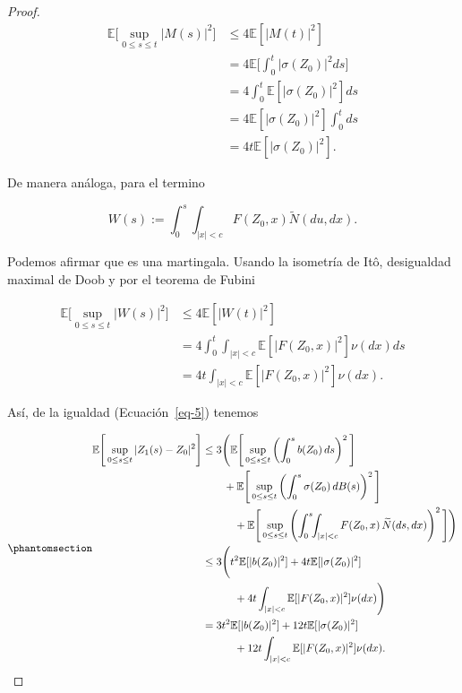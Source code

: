 \documentclass[
  spanish,
  us-letterpaper,
]{scrreprt}
\theoremstyle{plain}
\theoremstyle{plain}
\theoremstyle{plain}
\theoremstyle{definition}
\theoremstyle{remark}
\begin{document}
\begin{proof}
\[
    \begin{aligned}
        \mathbb{E}\Bigg[\sup\limits_{0\leq s\leq t}|M(s)|^2\Bigg] & \leq 4\mathbb{E}[|M(t)|^2]\\ 
        & = 4 \mathbb{E}\Bigg[\int_0^t |\sigma(Z_0)|^2ds\Bigg]\\ 
        & = 4 \int_0^t \mathbb{E}[|\sigma(Z_0)|^2]ds\\ 
        & = 4 \mathbb{E}[|\sigma(Z_0)|^2]\int_0^t ds\\ 
        & = 4t \mathbb{E}[|\sigma(Z_0)|^2].
    \end{aligned}
\]

De manera análoga, para el termino

\[
    W(s):= \int_0^s\int_{|x|<c}F(Z_0,x)\widetilde{N}(du,dx).
\]

Podemos afirmar que es una martingala. Usando la isometría de Itô,
desigualdad maximal de Doob y por el teorema de Fubini

\[
    \begin{aligned}
        \mathbb{E}\Bigg[\sup\limits_{0\leq s\leq t}|W(s)|^2\Bigg] & \leq 4\mathbb{E}[|W(t)|^2]\\ 
        & = 4\int_0^t\int_{|x|<c}\mathbb{E}[|F(Z_0,x)|^2]\nu(dx)ds\\ 
        & = 4t\int_{|x|<c}\mathbb{E}[|F(Z_0,x)|^2]\nu(dx).
    \end{aligned}
\]

Así, de la igualdad (Ecuación~\ref{eq-5}) tenemos

\begin{equation}\phantomsection\label{eq-7}{
    \begin{aligned}
        \mathbb{E}\Bigg[\sup\limits_{0\leq s\leq t}|Z_1(s)-Z_0|^2\Bigg] 
        & \leq 3\Bigg( \mathbb{E}\Bigg[\sup\limits_{0\leq s\leq t}\left(\int_0^s b(Z_0)\,ds\right)^2\Bigg]\\ 
            &\qquad
               + \mathbb{E}\Bigg[\sup\limits_{0\leq s\leq t} \left(\int_0^s \sigma(Z_0)\,dB(s)\right)^2\Bigg]\\
        &\qquad\quad
            +\mathbb{E}\Bigg[\sup\limits_{0\leq s\leq t} \left(\int_0^s\!\!\int_{|x|<c} F(Z_0,x)\,\widetilde{N}(ds,dx)\right)^2\Bigg]\Bigg)\\
        & \leq 3\Bigg(t^2\mathbb{E}[|b(Z_0)|^2]+4t\mathbb{E}[|\sigma(Z_0)|^2]\\ 
        & \qquad\quad + 4t\int_{|x|<c}\mathbb{E}[|F(Z_0,x)|^2]\nu(dx)\Bigg)\\ 
        & = 3t^2\mathbb{E}[|b(Z_0)|^2]+12t\mathbb{E}[|\sigma(Z_0)|^2]\\ 
        & \qquad\quad +12t\int_{|x|<c}\mathbb{E}[|F(Z_0,x)|^2]\nu(dx).
    \end{aligned}
}\end{equation}


\end{proof}
\end{document}
